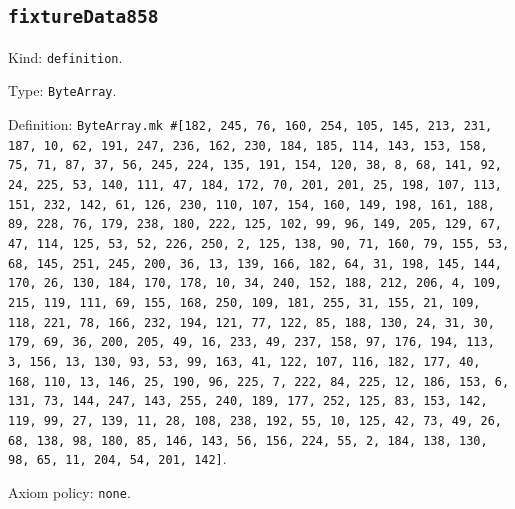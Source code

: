 \documentclass[11pt]{article}
\begin{document}
\subsection*{\texttt{fixtureData858}}
\noindent Kind: \texttt{definition}.\par
\noindent Type: \texttt{ByteArray}.\par
\noindent Definition: \texttt{ByteArray.mk \#[182, 245, 76, 160, 254, 105, 145, 213, 231, 187, 10, 62, 191, 247, 236, 162, 230, 184, 185, 114, 143, 153, 158, 75, 71, 87, 37, 56, 245, 224, 135, 191, 154, 120, 38, 8, 68, 141, 92, 24, 225, 53, 140, 111, 47, 184, 172, 70, 201, 201, 25, 198, 107, 113, 151, 232, 142, 61, 126, 230, 110, 107, 154, 160, 149, 198, 161, 188, 89, 228, 76, 179, 238, 180, 222, 125, 102, 99, 96, 149, 205, 129, 67, 47, 114, 125, 53, 52, 226, 250, 2, 125, 138, 90, 71, 160, 79, 155, 53, 68, 145, 251, 245, 200, 36, 13, 139, 166, 182, 64, 31, 198, 145, 144, 170, 26, 130, 184, 170, 178, 10, 34, 240, 152, 188, 212, 206, 4, 109, 215, 119, 111, 69, 155, 168, 250, 109, 181, 255, 31, 155, 21, 109, 118, 221, 78, 166, 232, 194, 121, 77, 122, 85, 188, 130, 24, 31, 30, 179, 69, 36, 200, 205, 49, 16, 233, 49, 237, 158, 97, 176, 194, 113, 3, 156, 13, 130, 93, 53, 99, 163, 41, 122, 107, 116, 182, 177, 40, 168, 110, 13, 146, 25, 190, 96, 225, 7, 222, 84, 225, 12, 186, 153, 6, 131, 73, 144, 247, 143, 255, 240, 189, 177, 252, 125, 83, 153, 142, 119, 99, 27, 139, 11, 28, 108, 238, 192, 55, 10, 125, 42, 73, 49, 26, 68, 138, 98, 180, 85, 146, 143, 56, 156, 224, 55, 2, 184, 138, 130, 98, 65, 11, 204, 54, 201, 142]}.\par
\noindent Axiom policy: \texttt{none}.\par
\end{document}
